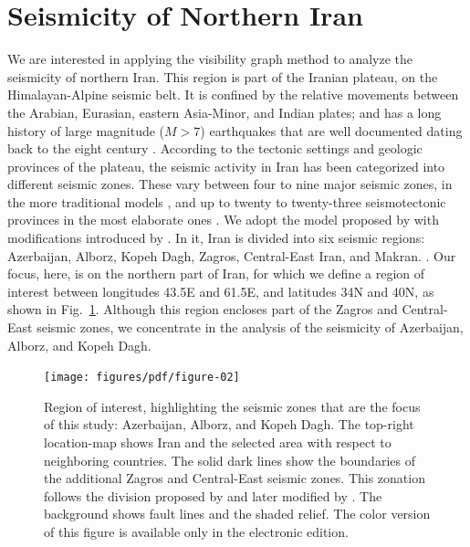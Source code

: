 
\section{Seismicity of Northern Iran}

We are interested in applying the visibility graph method to analyze the seismicity of northern Iran. This region is part of the Iranian plateau, on the Himalayan-Alpine seismic belt. It is confined by the relative movements between the Arabian, Eurasian, eastern Asia-Minor, and Indian plates; and has a long history of large magnitude ($M>7$) earthquakes that are well documented dating back to the eight century \citep[e.g.,][]{Berberian_1981_Chap}. According to the tectonic settings and geologic provinces of the plateau, the seismic activity in Iran has been categorized into different seismic zones. These vary between four to nine major seismic zones, in the more traditional models \citep[e.g.,][]{Stocklin1968, Takin1972, Berberian1976}, and up to twenty to twenty-three seismotectonic provinces in the most elaborate ones \citep[e.g.,][]{Nowroozi1976, Tavakoli1999}. We adopt the model proposed by \citet{Mirzaei1998} with modifications introduced by \citet{Karimiparidari2013}. In it, Iran is divided into six seismic regions: Azerbaijan, Alborz, Kopeh Dagh, Zagros, Central-East Iran, and Makran. . Our focus, here, is on the northern part of Iran, for which we define a region of interest between longitudes 43.5\textdegree{}E and 61.5\textdegree{}E, and latitudes 34\textdegree{}N and 40\textdegree{}N, as shown in Fig.~\ref{fig:study_region}. Although this region encloses part of the Zagros and Central-East seismic zones, we concentrate in the analysis of the seismicity of Azerbaijan, Alborz, and Kopeh Dagh.

\begin{figure}[t]
	\centering
	\texttt{[image: figures/pdf/figure-02]} 
	\caption{Region of interest, highlighting the seismic zones that are the focus of this study: Azerbaijan, Alborz, and Kopeh Dagh. The top-right location-map shows Iran and the selected area with respect to neighboring countries. The solid dark lines show the boundaries of the additional Zagros and Central-East seismic zones. This zonation follows the division proposed by \citet{Mirzaei1998} and later modified by \citet{Karimiparidari2013}. The background shows fault lines and the shaded relief. The color version of this figure is available only in the electronic edition.}
	\label{fig:study_region}
\end{figure}

